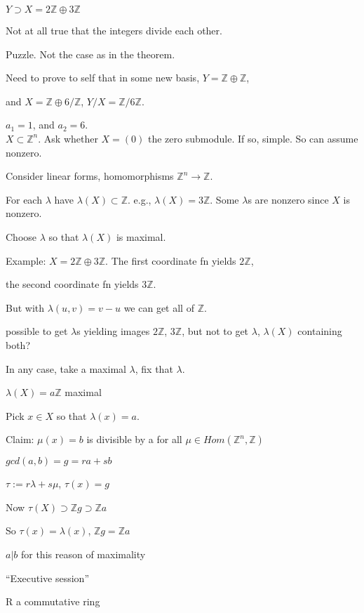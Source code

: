 \documentclass[12pt]{article}
\begin{document}
$Y \supset X = 2\mathds{Z} \oplus 3\mathds{Z}$

Not at all true that the integers divide each other.

Puzzle.  Not the case as in the theorem.

Need to prove to self that in some new basis, $Y = \mathds{Z} \oplus \mathds{Z}$, 

and $X = \mathds{Z} \oplus 6/\mathds{Z}$, $Y/X = \mathds{Z}/6\mathds{Z}$.

$a_1 = 1$, and $a_2 = 6$.\\

\noindent
$X \subset \mathds{Z}^n$.  Ask whether $X = (0)$ the zero submodule.  If so, simple.  So can assume nonzero.

Consider linear forms, homomorphisms $\mathds{Z}^n \to \mathds{Z}$.

For each $\lambda$ have $\lambda(X) \subset \mathds{Z}$.  e.g., $\lambda(X) = 3\mathds{Z}$.  Some $\lambda$s are nonzero since $X$ is nonzero.

Choose $\lambda$ so that $\lambda(X)$ is maximal.

Example: $X = 2\mathds{Z} \oplus 3\mathds{Z}$.  The first coordinate fn yields $2\mathds{Z}$, 

the second coordinate fn yields $3\mathds{Z}$.

But with $\lambda(u, v) = v - u$ we can get all of $\mathds{Z}$.

possible to get $\lambda$s yielding images $2\mathds{Z}$, $3\mathds{Z}$, but not to get $\lambda$, $\lambda(X)$ containing both?

In any case, take a maximal $\lambda$, fix that $\lambda$.

$\lambda(X) = a\mathds{Z}$ maximal

Pick $x \in X$ so that $\lambda(x) = a$.

\noindent
Claim: $\mu(x) = b$ is divisible by a for all $\mu \in Hom(\mathds{Z}^n, \mathds{Z})$

$gcd(a, b) = g = ra + sb$

$\tau := r\lambda + s\mu$, $\tau(x) = g$

Now $\tau(X) \supset \mathds{Z}g \supset \mathds{Z}a$

So $\tau(x) = \lambda(x)$, $\mathds{Z}g = \mathds{Z}a$

$a | b$ for this reason of maximality

\noindent
``Executive session''

R a commutative ring
\end{document}
